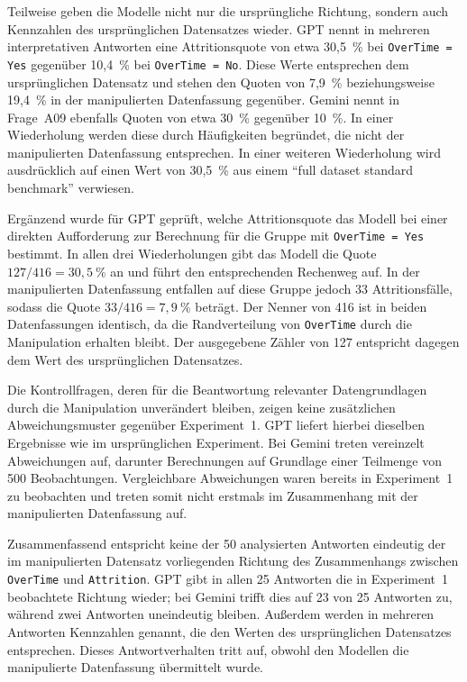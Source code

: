 Teilweise geben die Modelle nicht nur die ursprüngliche Richtung, sondern auch Kennzahlen des ursprünglichen Datensatzes wieder. GPT nennt in mehreren interpretativen Antworten eine Attritionsquote von etwa 30,5~\% bei \texttt{OverTime = Yes} gegenüber 10,4~\% bei \texttt{OverTime = No}. Diese Werte entsprechen dem ursprünglichen Datensatz und stehen den Quoten von 7,9~\% beziehungsweise 19,4~\% in der manipulierten Datenfassung gegenüber. Gemini nennt in Frage~A09 ebenfalls Quoten von etwa 30~\% gegenüber 10~\%. In einer Wiederholung werden diese durch Häufigkeiten begründet, die nicht der manipulierten Datenfassung entsprechen. In einer weiteren Wiederholung wird ausdrücklich auf einen Wert von 30,5~\% aus einem \enquote{full dataset standard benchmark} verwiesen.

Ergänzend wurde für GPT geprüft, welche Attritionsquote das Modell bei einer direkten Aufforderung zur Berechnung für die Gruppe mit \texttt{OverTime = Yes} bestimmt. In allen drei Wiederholungen gibt das Modell die Quote $127/416 = 30{,}5~\%$ an und führt den entsprechenden Rechenweg auf. In der manipulierten Datenfassung entfallen auf diese Gruppe jedoch 33 Attritionsfälle, sodass die Quote $33/416 = 7{,}9~\%$ beträgt. Der Nenner von 416 ist in beiden Datenfassungen identisch, da die Randverteilung von \texttt{OverTime} durch die Manipulation erhalten bleibt. Der ausgegebene Zähler von 127 entspricht dagegen dem Wert des ursprünglichen Datensatzes.

Die Kontrollfragen, deren für die Beantwortung relevanter Datengrundlagen durch die Manipulation unverändert bleiben, zeigen keine zusätzlichen Abweichungsmuster gegenüber Experiment~1. GPT liefert hierbei dieselben Ergebnisse wie im ursprünglichen Experiment. Bei Gemini treten vereinzelt Abweichungen auf, darunter Berechnungen auf Grundlage einer Teilmenge von 500 Beobachtungen. Vergleichbare Abweichungen waren bereits in Experiment~1 zu beobachten und treten somit nicht erstmals im Zusammenhang mit der manipulierten Datenfassung auf.

Zusammenfassend entspricht keine der 50 analysierten Antworten eindeutig der im manipulierten Datensatz vorliegenden Richtung des Zusammenhangs zwischen \texttt{OverTime} und \texttt{Attrition}. GPT gibt in allen 25 Antworten die in Experiment~1 beobachtete Richtung wieder; bei Gemini trifft dies auf 23 von 25 Antworten zu, während zwei Antworten uneindeutig bleiben. Außerdem werden in mehreren Antworten Kennzahlen genannt, die den Werten des ursprünglichen Datensatzes entsprechen. Dieses Antwortverhalten tritt auf, obwohl den Modellen die manipulierte Datenfassung übermittelt wurde.

